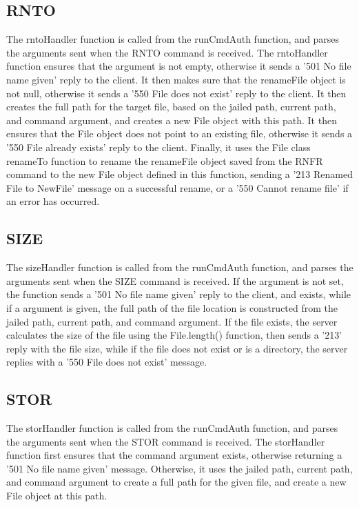 \documentclass[11pt,a4paper,titlepage]{article}
\begin{document}
\subsection{RNTO}
The rntoHandler function is called from the runCmdAuth function, and parses the arguments sent when the RNTO command is received. The rntoHandler function ensures that the argument is not empty, otherwise it sends a '501 No file name given' reply to the client. It then makes sure that the renameFile object is not null, otherwise it sends a '550 File does not exist' reply to the client. It then creates the full path for the target file, based on the jailed path, current path, and command argument, and creates a new File object with this path. It then ensures that the File object does not point to an existing file, otherwise it sends a '550 File already exists' reply to the client. Finally, it uses the File class renameTo function to rename the renameFile object saved from the RNFR command to the new File object defined in this function, sending a '213 Renamed File to NewFile' message on a successful rename, or a '550 Cannot rename file' if an error has occurred.

\subsection{SIZE}
The sizeHandler function is called from the runCmdAuth function, and parses the arguments sent when the SIZE command is received. If the argument is not set, the function sends a '501 No file name given' reply to the client, and exists, while if a argument is given, the full path of the file location is constructed from the jailed path, current path, and command argument. If the file exists, the server calculates the size of the file using the File.length() function, then sends a '213' reply with the file size, while if the file does not exist or is a directory, the server replies with a '550 File does not exist' message.

\subsection{STOR}
The storHandler function is called from the runCmdAuth function, and parses the arguments sent when the STOR command is received. The storHandler function first ensures that the command argument exists, otherwise returning a '501 No file name given' message. Otherwise, it uses the jailed path, current path, and command argument to create a full path for the given file, and create a new File object at this path.
\end{document}
